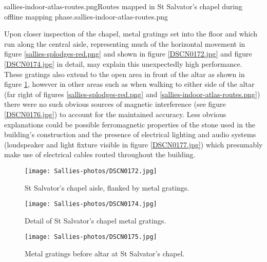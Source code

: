        {sallies-indoor-atlas-routes.png}{Routes mapped in St Salvator's chapel during offline mapping phase.}{sallies-indoor-atlas-routes.png}

Upon closer inspection of the chapel, metal gratings set into the floor and which run along the central aisle, representing much of the horizontal movement in figure \ref{sallies-splodges-red.png} and shown in figure \ref{DSCN0172.jpg} and figure \ref{DSCN0174.jpg} in detail, may explain this unexpectedly high performance. These gratings also extend to the open area in front of the altar as shown in figure \ref{DSCN0175.jpg}, however in other areas such as when walking to either side of the altar (far right of figures \ref{sallies-splodges-red.png} and \ref{sallies-indoor-atlas-routes.png}) there were no such obvious sources of magnetic interference (see figure \ref{DSCN0176.jpg}) to account for the maintained accuracy. Less obvious explanations could be possible ferromagnetic properties of the stone used in the building's construction and the presence of electrical lighting and audio systems (loudspeaker and light fixture visible in figure \ref{DSCN0177.jpg}) which presumably make use of electrical cables routed throughout the building.

\begin{figure}[h]
    \begin{center}
    \begin{minipage}{.32\textwidth}
        \begin{center}
        \texttt{[image: Sallies-photos/DSCN0172.jpg]}
        \caption{St Salvator's chapel aisle, flanked by metal gratings.}
        \label{DSCN0172.jpg}
        \end{center}
    \end{minipage}%
    \hspace{.01\textwidth}
    \begin{minipage}{.32\textwidth}
		\begin{center}
        \texttt{[image: Sallies-photos/DSCN0174.jpg]}
        \caption{Detail of St Salvator's chapel metal gratings.}
        \label{DSCN0174.jpg}
        \end{center}
    \end{minipage}%
    \hspace{.01\textwidth}
    \begin{minipage}{.32\textwidth}
        \begin{center}
        \texttt{[image: Sallies-photos/DSCN0175.jpg]}
        \caption{Metal gratings before altar at St Salvator's chapel.}
        \label{DSCN0175.jpg}
        \end{center}
    \end{minipage}
    \end{center}
\end{figure}

